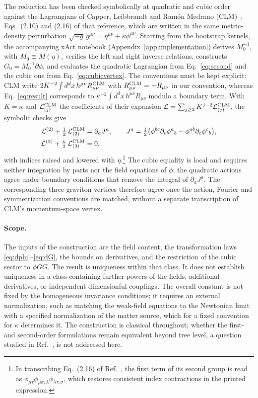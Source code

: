 \documentclass[prd,aps,preprint,superscriptaddress,nofootinbib,amsmath,amssymb,eqsecnum]{revtex4-2}
\begin{document}
The reduction has been checked symbolically at quadratic and cubic order against the
Lagrangians of Capper, Leibbrandt and Ram\'on Medrano (CLM)~\cite{CLM1973}, Eqs.~(2.10) and
(2.16) of that reference, which are written in the same metric-density perturbation
$\sqrt{-g}\,g^{\mu\nu}=\eta^{\mu\nu}+\kappa\phi^{\mu\nu}$. Starting from the bootstrap
kernels, the accompanying xAct notebook (Appendix~\ref{app:implementation}) derives
$M_0^{-1}$, with $M_0\equiv M(\eta)$, verifies the left and right inverse relations,
constructs $G_0=M_0^{-1}\partial\phi$, and evaluates the quadratic Lagrangian from
Eq.~\eqref{eq:second} and the cubic one from Eq.~\eqref{eq:cubicvertex}. The conventions
must be kept explicit: CLM write $2K^{-2}\int d^dx\,h^{\mu\nu}R^{\rm CLM}_{\mu\nu}$ with
$R^{\rm CLM}_{\mu\nu}=-R_{\mu\nu}$ in our convention, whereas Eq.~\eqref{eq:result}
corresponds to $\kappa^{-2}\int d^dx\,h^{\mu\nu}R_{\mu\nu}$ modulo a boundary term. With
$K=\kappa$ and $\mathcal L^{\rm CLM}_{(j)}$ the coefficients of their expansion
$\mathcal L=\sum_{j\ge2}K^{j-2}\mathcal L^{\rm CLM}_{(j)}$, the symbolic checks give
\begin{align}
\mathcal L^{(2)}+\tfrac12\,\mathcal L^{\rm CLM}_{(2)}&=\partial_aJ^a,\qquad
J^a=\tfrac12\big(\phi^{bc}\partial_c\phi^{a}{}_{b}-\phi^{ab}\partial_c\phi^{c}{}_{b}\big),
\label{eq:clm-quadratic}\\
\mathcal L^{(3)}+\tfrac{\kappa}{2}\,\mathcal L^{\rm CLM}_{(3)}&=0,
\label{eq:clm-cubic}
\end{align}
with indices raised and lowered with $\eta$.\footnote{In transcribing Eq.~(2.16) of
Ref.~\cite{CLM1973}, the first term of its second group is read as
$\phi_{\mu\tau}\phi_{\mu\sigma,\lambda}\phi_{\lambda\tau,\sigma}$, which restores consistent
index contractions in the printed expression.} The cubic equality is local and requires
neither integration by parts nor the field equations of $\phi$; the quadratic actions agree
under boundary conditions that remove the integral of $\partial_aJ^a$. The corresponding
three-graviton vertices therefore agree once the action, Fourier and symmetrization
conventions are matched, without a separate transcription of CLM's momentum-space vertex.

\paragraph{Scope.} The inputs of the construction are the field content, the transformation
laws \eqref{eq:dphi}--\eqref{eq:dG}, the bounds on derivatives, and the restriction of the
cubic sector to $\phi GG$. The result is uniqueness within that class. It does not establish
uniqueness in a class containing further powers of the fields, additional derivatives, or
independent dimensionful couplings. The overall constant is not fixed by the homogeneous
invariance conditions; it requires an external normalization, such as matching the
weak-field equations to the Newtonian limit with a specified normalization of the matter
source, which for a fixed convention for $\kappa$ determines it. The construction is classical
throughout; whether the first- and second-order formulations remain equivalent beyond tree
level, a question studied in Ref.~\cite{BrandtMcKeon2016}, is not addressed here.
\end{document}
